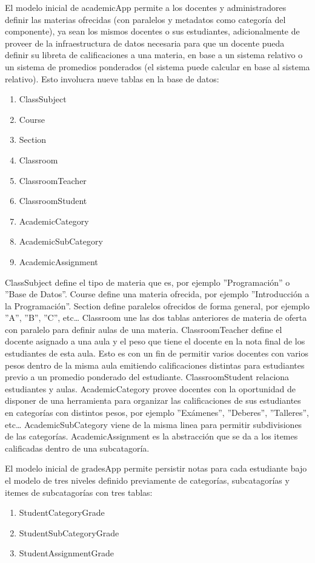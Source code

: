 El modelo inicial de academicApp permite a los docentes y administradores definir las materias ofrecidas (con paralelos y metadatos como categoría del componente), ya sean los mismos docentes o sus estudiantes, adicionalmente de proveer de la infraestructura de datos necesaria para que un docente pueda definir su libreta de calificaciones a una materia, en base a un sistema relativo o un sistema de promedios ponderados (el sistema puede calcular en base al sistema relativo). Esto involucra nueve tablas en la base de datos:
\begin{enumerate}
  \item ClassSubject
  \item Course
  \item Section
  \item Classroom
  \item ClassroomTeacher
  \item ClassroomStudent
  \item AcademicCategory
  \item AcademicSubCategory
  \item AcademicAssignment
\end{enumerate}
ClassSubject define el tipo de materia que es, por ejemplo ''Programación'' o ''Base de Datos''. Course define una materia ofrecida, por ejemplo ''Introducción a la Programación''. Section define paralelos ofrecidos de forma general, por ejemplo ''A'', ''B'', ''C'', etc\ldots{} Classroom une las dos tablas anteriores de materia de oferta con paralelo para definir aulas de una materia. ClassroomTeacher define el docente asignado a una aula y el peso que tiene el docente en la nota final de los estudiantes de esta aula. Esto es con un fin de permitir varios docentes con varios pesos dentro de la misma aula emitiendo calificaciones distintas para estudiantes previo a un promedio ponderado del estudiante. ClassroomStudent relaciona estudiantes y aulas. AcademicCategory provee docentes con la oportunidad de disponer de una herramienta para organizar las calificaciones de sus estudiantes en categorías con distintos pesos, por ejemplo ''Exámenes'', ''Deberes'', ''Talleres'', etc\ldots{} AcademicSubCategory viene de la misma linea para permitir subdivisiones de las categorías. AcademicAssignment es la abstracción que se da a los itemes calificadas dentro de una subcatagoría.

El modelo inicial de gradesApp permite persistir notas para cada estudiante bajo el modelo de tres niveles definido previamente de categorías, subcatagorías y itemes de subcatagorías con tres tablas:
\begin{enumerate}
  \item StudentCategoryGrade
  \item StudentSubCategoryGrade
  \item StudentAssignmentGrade
\end{enumerate}

